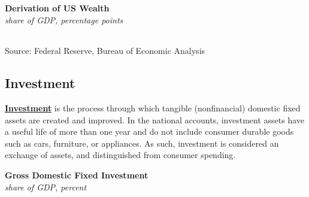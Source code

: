 \documentclass{report}
\begin{document}
{\begin{minipage}{0.76\textwidth}
\normalsize \textbf{Derivation of US Wealth}\\
\footnotesize{\textit{share of GDP, percentage points}}
\vspace*{-6mm}

 \setlength{\tabcolsep}{4.2pt} \color{black!90}
		{\renewcommand{\arraystretch}{1.6}
		 \begin{tabular}{p{39mm} R{8mm} R{8mm} R{8mm} R{8mm} 
		   R{8mm} R{8mm} R{8mm} }
			  \hline
		\end{tabular}}	\vspace{-2mm}
		
\footnotesize{Source: Federal Reserve, Bureau of Economic Analysis}
\end{minipage}
\newpage
\vspace*{-9mm}

\hypertarget{ofi}{\label{ofi}}
\begin{minipage}{0.76\textwidth}
\subsection*{Investment}   

\small \textbf{\href{https://www.bea.gov/resources/learning-center/what-to-know-fixed-assets}{Investment}} is the process through which tangible (nonfinancial) domestic fixed assets are created and improved. In the national accounts, investment assets have a useful life of more than one year and do not include consumer durable goods such as cars, furniture, or appliances. As such, investment is considered an exchange of assets, and distinguished from consumer spending. 

 


\vspace{1mm}

\normalsize \textbf{Gross Domestic Fixed Investment}\\
\footnotesize{\textit{share of GDP, percent}}
\vspace{2.85cm}


\end{minipage}}
\end{document}
